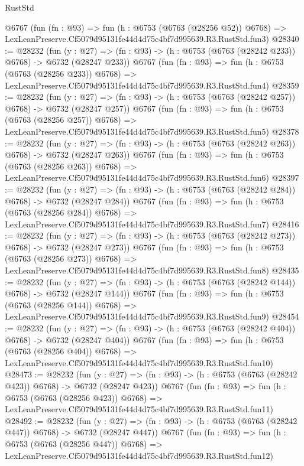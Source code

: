 \begin{lexlean}{RustStd}
\begin{coremodule}
    @6767
    (fun (fn : @93) =>
    fun (h : @6753 (@6763 (@28256 @52)) @6768) =>
    LexLeanPreserve.Cf5079d95131fe44d4d75c4bf7d995639.R3.RustStd.fun3)
@28340 := @28232
    (fun (y : @27) => (fn : @93) -> (h : @6753 (@6763 (@28242 @233)) @6768) -> @6732 (@28247 @233))
    @6767
    (fun (fn : @93) =>
    fun (h : @6753 (@6763 (@28256 @233)) @6768) =>
    LexLeanPreserve.Cf5079d95131fe44d4d75c4bf7d995639.R3.RustStd.fun4)
@28359 := @28232
    (fun (y : @27) => (fn : @93) -> (h : @6753 (@6763 (@28242 @257)) @6768) -> @6732 (@28247 @257))
    @6767
    (fun (fn : @93) =>
    fun (h : @6753 (@6763 (@28256 @257)) @6768) =>
    LexLeanPreserve.Cf5079d95131fe44d4d75c4bf7d995639.R3.RustStd.fun5)
@28378 := @28232
    (fun (y : @27) => (fn : @93) -> (h : @6753 (@6763 (@28242 @263)) @6768) -> @6732 (@28247 @263))
    @6767
    (fun (fn : @93) =>
    fun (h : @6753 (@6763 (@28256 @263)) @6768) =>
    LexLeanPreserve.Cf5079d95131fe44d4d75c4bf7d995639.R3.RustStd.fun6)
@28397 := @28232
    (fun (y : @27) => (fn : @93) -> (h : @6753 (@6763 (@28242 @284)) @6768) -> @6732 (@28247 @284))
    @6767
    (fun (fn : @93) =>
    fun (h : @6753 (@6763 (@28256 @284)) @6768) =>
    LexLeanPreserve.Cf5079d95131fe44d4d75c4bf7d995639.R3.RustStd.fun7)
@28416 := @28232
    (fun (y : @27) => (fn : @93) -> (h : @6753 (@6763 (@28242 @273)) @6768) -> @6732 (@28247 @273))
    @6767
    (fun (fn : @93) =>
    fun (h : @6753 (@6763 (@28256 @273)) @6768) =>
    LexLeanPreserve.Cf5079d95131fe44d4d75c4bf7d995639.R3.RustStd.fun8)
@28435 := @28232
    (fun (y : @27) => (fn : @93) -> (h : @6753 (@6763 (@28242 @144)) @6768) -> @6732 (@28247 @144))
    @6767
    (fun (fn : @93) =>
    fun (h : @6753 (@6763 (@28256 @144)) @6768) =>
    LexLeanPreserve.Cf5079d95131fe44d4d75c4bf7d995639.R3.RustStd.fun9)
@28454 := @28232
    (fun (y : @27) => (fn : @93) -> (h : @6753 (@6763 (@28242 @404)) @6768) -> @6732 (@28247 @404))
    @6767
    (fun (fn : @93) =>
    fun (h : @6753 (@6763 (@28256 @404)) @6768) =>
    LexLeanPreserve.Cf5079d95131fe44d4d75c4bf7d995639.R3.RustStd.fun10)
@28473 := @28232
    (fun (y : @27) => (fn : @93) -> (h : @6753 (@6763 (@28242 @423)) @6768) -> @6732 (@28247 @423))
    @6767
    (fun (fn : @93) =>
    fun (h : @6753 (@6763 (@28256 @423)) @6768) =>
    LexLeanPreserve.Cf5079d95131fe44d4d75c4bf7d995639.R3.RustStd.fun11)
@28492 := @28232
    (fun (y : @27) => (fn : @93) -> (h : @6753 (@6763 (@28242 @447)) @6768) -> @6732 (@28247 @447))
    @6767
    (fun (fn : @93) =>
    fun (h : @6753 (@6763 (@28256 @447)) @6768) =>
    LexLeanPreserve.Cf5079d95131fe44d4d75c4bf7d995639.R3.RustStd.fun12)

\end{coremodule}
\end{lexlean}
